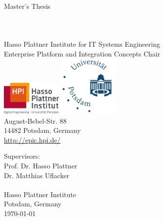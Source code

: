 \begin{titlepage}

\thispagestyle{empty}
\begin{center}
	\LARGE
	Master's Thesis\\
	\vspace{0.4cm}
	\Huge
    \TITLE{}\\
	\vspace{0.4cm}
	\large
	\LARGE
	\textbf{\AUTHOR}\\
	\normalsize
  \Mail{\EMAIL}\\
	\vspace{0.4cm}
	\small
	Hasso Plattner Institute for IT Systems Engineering\\
	Enterprise Platform and Integration Concepts Chair\\
	\vspace{0.3cm}
	\includegraphics[width=3cm]{figures/hpi_logo_2017_cmyk_wb_sl1}
	\hspace{1cm}
	\includegraphics[width=3cm]{figures/Universitaet_Potsdam_logo}\\
	\vspace{0.1cm}
	August-Bebel-Str. 88\\
	14482 Potsdam, Germany\\
	\url{http://epic.hpi.de/}\\
\end{center}
Supervisors:
\vspace{0.3cm}\\
Prof. Dr. Hasso Plattner\\
Dr. Matthias Uflacker\\
\SUPERVISOR
\vspace{0.3cm}\\
Hasso Plattner Institute\\
Potsdam, Germany
\vspace{0.4cm}\\
\today
\end{titlepage}
